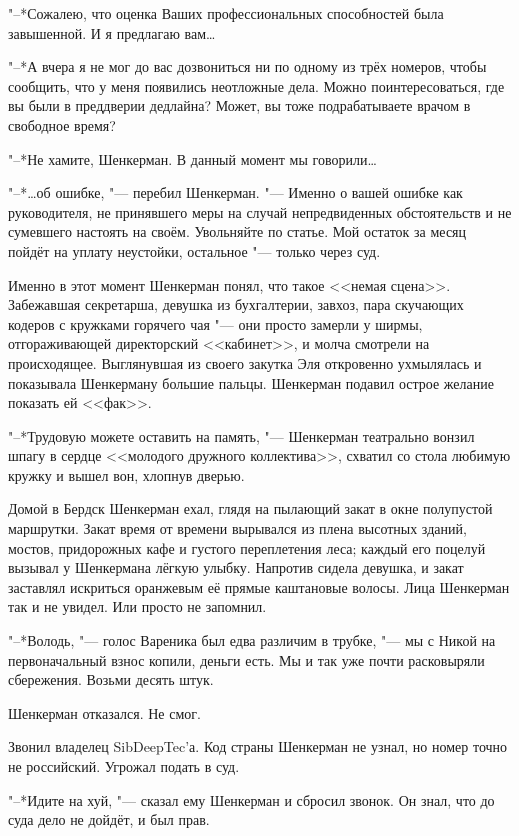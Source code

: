 "--*Сожалею, что оценка Ваших профессиональных способностей была завышенной.
И я предлагаю вам\ldots{}

"--*А вчера я не мог до вас дозвониться ни по одному из трёх номеров, чтобы сообщить, что у меня появились неотложные дела.
Можно поинтересоваться, где вы были в преддверии дедлайна?
Может, вы тоже подрабатываете врачом в свободное время?

"--*Не хамите, Шенкерман.
В данный момент мы говорили\ldots{}

"--*\ldots{}об ошибке, "--- перебил Шенкерман.
"--- Именно о вашей ошибке как руководителя, не принявшего меры на случай непредвиденных обстоятельств и не сумевшего настоять на своём.
Увольняйте по статье.
Мой остаток за месяц пойдёт на уплату неустойки, остальное "--- только через суд.

Именно в этот момент Шенкерман понял, что такое <<немая сцена>>.
Забежавшая секретарша, девушка из бухгалтерии, завхоз, пара скучающих кодеров с кружками горячего чая "--- они просто замерли у ширмы, отгораживающей директорский <<кабинет>>, и молча смотрели на происходящее.
Выглянувшая из своего закутка Эля откровенно ухмылялась и показывала Шенкерману большие пальцы.
Шенкерман подавил острое желание показать ей <<фак>>.

"--*Трудовую можете оставить на память, "--- Шенкерман театрально вонзил шпагу в сердце <<молодого дружного коллектива>>, схватил со стола любимую кружку и вышел вон, хлопнув дверью.

\asterism

Домой в Бердск Шенкерман ехал, глядя на пылающий закат в окне полупустой маршрутки.
Закат время от времени вырывался из плена высотных зданий, мостов, придорожных кафе и густого переплетения леса;
каждый его поцелуй вызывал у Шенкермана лёгкую улыбку.
Напротив сидела девушка, и закат заставлял искриться оранжевым её прямые каштановые волосы.
Лица Шенкерман так и не увидел.
Или просто не запомнил.

"--*Володь, "--- голос Вареника был едва различим в трубке, "--- мы с Никой на первоначальный взнос копили, деньги есть.
Мы и так уже почти расковыряли сбережения.
Возьми десять штук.

Шенкерман отказался.
Не смог.

Звонил владелец SibDeepTec'а.
Код страны Шенкерман не узнал, но номер точно не российский.
Угрожал подать в суд.

"--*Идите на хуй, "--- сказал ему Шенкерман и сбросил звонок.
Он знал, что до суда дело не дойдёт, и был прав.

